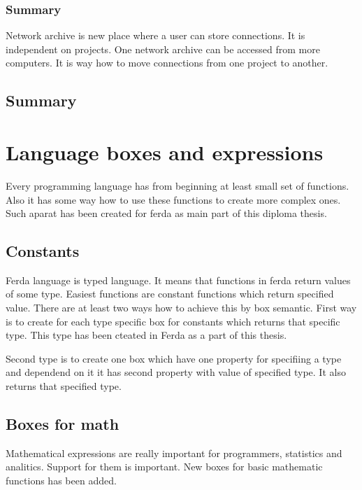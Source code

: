 \documentclass[a4paper,12pt]{book}
\begin{document}
\subsubsection{Summary}
Network archive is new place where a user can store connections. It is independent on projects. One network archive can be accessed from more computers. It is way how to move connections from one project to another.

\subsection{Summary}

\section{Language boxes and expressions}
Every programming language has from beginning at least small set of functions. Also it has some way how to use these functions to create more complex ones. Such aparat has been created for ferda as main part of this diploma thesis.

\subsection{Constants}
Ferda language is typed language. It means that functions in ferda return values of some type. Easiest functions are constant functions which return specified value. There are at least two ways how to achieve this by box semantic. First way is to create for each type specific box for constants which returns that specific type. This type has been cteated in Ferda as a part of this thesis.

Second type is to create one box which have one property for specifiing a type and dependend on it it has second property with value of specified type. It also returns that specified type.

\subsection{Boxes for math}
Mathematical expressions are really important for programmers, statistics and analitics. Support for them is important. New boxes for basic mathematic functions has been added. 
\end{document}
